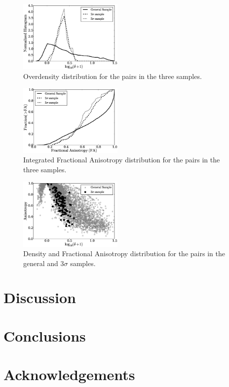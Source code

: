 \documentclass{emulateapj}
\begin{document}
\begin{figure}
\begin{center}
  \includegraphics[width=0.45\textwidth]{density_histogram.eps}
\end{center}
\caption{Overdensity distribution for the pairs in the three samples.
    \label{fig:density}}  
\end{figure}


\begin{figure}
\begin{center}
  \includegraphics[width=0.45\textwidth]{FA_histogram.eps}
\end{center}
\caption{Integrated Fractional Anisotropy distribution for the pairs in the three samples.
    \label{fig:FA}}  
\end{figure}

\begin{figure}
\begin{center}
  \includegraphics[width=0.45\textwidth]{FA_delta_scatter.eps}
\end{center}
\caption{Density and Fractional Anisotropy distribution for the pairs in the general and $3\sigma$ samples.
    \label{fig:FA}}  
\end{figure}

\section{Discussion}
\label{sec:discussion}

\section{Conclusions}
\label{sec:conclusions}


\section*{Acknowledgements}


 
\end{document}
